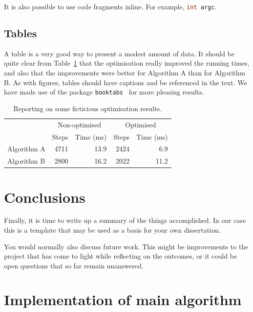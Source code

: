 \documentclass[12pt]{article}
\theoremstyle{plain}
\theoremstyle{definition}
\begin{document}
It is also possible to use code fragments inline. For example,
\lstinline[language=c]|int argc|.

\subsection{Tables}
\label{sec:typesetting_tables}

A table is a very good way to present a modest amount of data. It
should be quite clear from Table~\ref{tab:optimise} that the
optimisation really improved the running times, and also that the
improvements were better for Algorithm A than for Algorithm B. As with
figures, tables should have captions and be referenced in the text. We
have made use of the package \verb|booktabs|~\cite{ctan-booktabs} for
more pleasing results.

\begin{table}[ht]
  \centering
  \begin{tabular}{lrrrr}
    \toprule
    & \multicolumn{2}{c}{Non-optimised} & \multicolumn{2}{c}{Optimised}
    \\\cmidrule(lr){2-3}\cmidrule(lr){4-5}
    & Steps & Time (ms) & Steps  & Time (ms) \\
    \midrule
    Algorithm A & 4711 & 13.9 & 2424 & 6.9 \\
    Algorithm B & 2800 & 16.2 & 2022 & 11.2 \\
    \bottomrule
  \end{tabular}
  \caption{Reporting on some ficticious optimisation results.}
  \label{tab:optimise}
\end{table}

\section{Conclusions}
\label{sec:conclusion}

Finally, it is time to write up a summary of the things
accomplished. In our case this is a template that may be used as a
basis for your own dissertation.

You would normally also discuss future work. This might be
improvements to the project that has come to light while reflecting on
the outcomes, or it could be open questions that so far remain unanswered.

\printbibliography 

\clearpage\appendix

\section{Implementation of main algorithm}
\label{app:implementation_algorithm}


\end{document}
